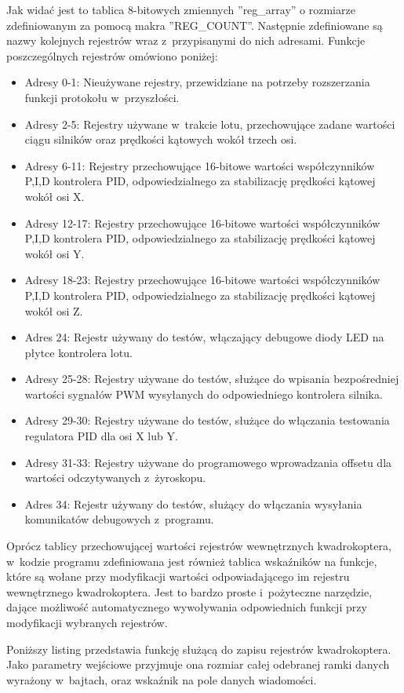 Jak widać jest to tablica 8-bitowych zmiennych ''reg\_array'' o rozmiarze zdefiniowanym za pomocą makra ''REG\_COUNT''. Następnie zdefiniowane są nazwy kolejnych rejestrów wraz z~przypisanymi do nich adresami. Funkcje poszczególnych rejestrów omówiono poniżej:
\begin{itemize}
	\item Adresy 0-1: Nieużywane rejestry, przewidziane na potrzeby rozszerzania funkcji protokołu w~przyszłości.
	\item Adresy 2-5: Rejestry używane w~trakcie lotu, przechowujące zadane wartości ciągu silników oraz prędkości kątowych wokół trzech osi.
	\item Adresy 6-11: Rejestry przechowujące 16-bitowe wartości współczynników P,I,D kontrolera PID, odpowiedzialnego za stabilizację prędkości kątowej wokół osi X.
	\item Adresy 12-17: Rejestry przechowujące 16-bitowe wartości współczynników P,I,D kontrolera PID, odpowiedzialnego za stabilizację prędkości kątowej wokół osi Y.
	\item Adresy 18-23: Rejestry przechowujące 16-bitowe wartości współczynników P,I,D kontrolera PID, odpowiedzialnego za stabilizację prędkości kątowej wokół osi Z.
	\item Adres 24: Rejestr używany do testów, włączający debugowe diody LED na płytce kontrolera lotu.
	\item Adresy 25-28: Rejestry używane do testów, służące do wpisania bezpośredniej wartości sygnałów PWM wysyłanych do odpowiedniego kontrolera silnika.
	\item Adresy 29-30: Rejestry używane do testów, służące do włączania testowania regulatora PID dla osi X lub Y.
	\item Adresy 31-33: Rejestry używane do programowego wprowadzania offsetu dla wartości odczytywanych z~żyroskopu.
	\item Adres 34: Rejestr używany do testów, służący do włączania wysyłania komunikatów debugowych z~programu.
\end{itemize}

Oprócz tablicy przechowującej wartości rejestrów wewnętrznych kwadrokoptera, w~kodzie programu zdefiniowana jest również tablica wskaźników na funkcje, które są wołane przy modyfikacji wartości odpowiadającego im rejestru wewnętrznego kwadrokoptera. Jest to bardzo proste i~pożyteczne narzędzie, dające możliwość automatycznego wywoływania odpowiednich funkcji przy modyfikacji wybranych rejestrów.


Poniższy listing przedstawia funkcję służącą do zapisu rejestrów kwadrokoptera. Jako parametry wejściowe przyjmuje ona rozmiar całej odebranej ramki danych wyrażony w~bajtach, oraz wskaźnik na pole danych wiadomości.


